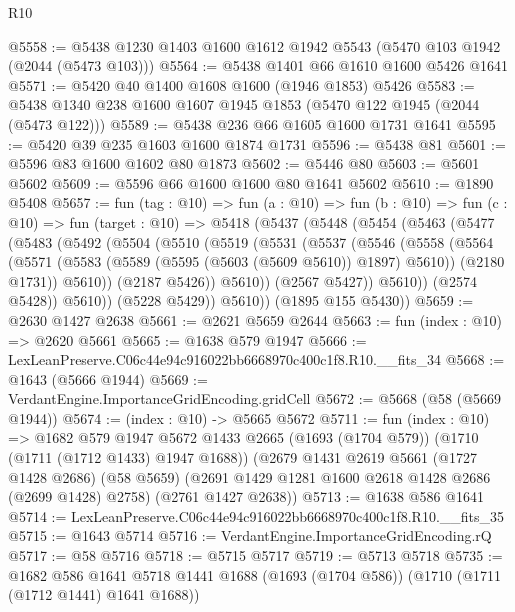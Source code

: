 \begin{lexlean}{R10}
\begin{coremodule}
@5558 := @5438 @1230 @1403 @1600 @1612 @1942 @5543 (@5470 @103 @1942 (@2044 (@5473 @103)))
@5564 := @5438 @1401 @66 @1610 @1600 @5426 @1641
@5571 := @5420 @40 @1400 @1608 @1600 (@1946 @1853) @5426
@5583 := @5438 @1340 @238 @1600 @1607 @1945 @1853 (@5470 @122 @1945 (@2044 (@5473 @122)))
@5589 := @5438 @236 @66 @1605 @1600 @1731 @1641
@5595 := @5420 @39 @235 @1603 @1600 @1874 @1731
@5596 := @5438 @81
@5601 := @5596 @83 @1600 @1602 @80 @1873
@5602 := @5446 @80
@5603 := @5601 @5602
@5609 := @5596 @66 @1600 @1600 @80 @1641 @5602
@5610 := @1890 @5408
@5657 := fun (tag : @10) =>
  fun (a : @10) =>
  fun (b : @10) =>
  fun (c : @10) =>
  fun (target : @10) =>
  @5418
    (@5437
      (@5448
        (@5454
          (@5463
            (@5477
              (@5483
                (@5492
                  (@5504
                    (@5510
                      (@5519
                        (@5531
                          (@5537
                            (@5546
                              (@5558
                                (@5564
                                  (@5571
                                    (@5583 (@5589 (@5595 (@5603 (@5609 @5610)) @1897) @5610))
                                    (@2180 @1731))
                                  @5610))
                              (@2187 @5426))
                            @5610))
                        (@2567 @5427))
                      @5610))
                  (@2574 @5428))
                @5610))
            (@5228 @5429))
          @5610))
      (@1895 @155 @5430))
@5659 := @2630 @1427 @2638
@5661 := @2621 @5659 @2644
@5663 := fun (index : @10) => @2620 @5661
@5665 := @1638 @579 @1947
@5666 := LexLeanPreserve.C06c44e94c916022bb6668970c400c1f8.R10.__fits_34
@5668 := @1643 (@5666 @1944)
@5669 := VerdantEngine.ImportanceGridEncoding.gridCell
@5672 := @5668 (@58 (@5669 @1944))
@5674 := (index : @10) -> @5665 @5672
@5711 := fun (index : @10) =>
  @1682
    @579
    @1947
    @5672
    @1433
    @2665
    (@1693 (@1704 @579))
    (@1710 (@1711 (@1712 @1433) @1947 @1688))
    (@2679
      @1431
      @2619
      @5661
      (@1727 @1428 @2686)
      (@58 @5659)
      (@2691 @1429 @1281 @1600 @2618 @1428 @2686 (@2699 @1428) @2758)
      (@2761 @1427 @2638))
@5713 := @1638 @586 @1641
@5714 := LexLeanPreserve.C06c44e94c916022bb6668970c400c1f8.R10.__fits_35
@5715 := @1643 @5714
@5716 := VerdantEngine.ImportanceGridEncoding.rQ
@5717 := @58 @5716
@5718 := @5715 @5717
@5719 := @5713 @5718
@5735 := @1682
    @586
    @1641
    @5718
    @1441
    @1688
    (@1693 (@1704 @586))
    (@1710 (@1711 (@1712 @1441) @1641 @1688))

\end{coremodule}
\end{lexlean}
